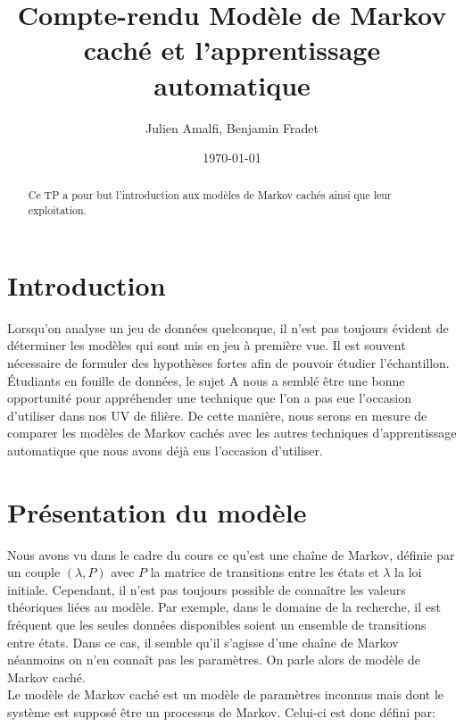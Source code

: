 \documentclass{article}
\title{Compte-rendu Modèle de Markov caché et l'apprentissage automatique}
\author{Julien Amalfi, Benjamin Fradet}
\date{\today}
\begin{document}
\maketitle
\thispagestyle{fancy}


\begin{abstract}
    Ce TP a pour but l'introduction aux modèles de Markov cachés ainsi que leur
    exploitation.
\end{abstract}


\begin{multicols}{2}

\section{Introduction}\label{sec:intro}

Lorsqu’on analyse un jeu de données quelconque, il n’est pas toujours évident de
déterminer les modèles qui sont mis en jeu à première vue. Il est souvent
nécessaire de formuler des hypothèses fortes afin de pouvoir étudier
l’échantillon. Étudiants en fouille de données, le sujet A nous a semblé être
une bonne opportunité pour appréhender une technique que l’on a pas eue
l’occasion d'utiliser dans nos UV de filière. De cette manière, nous serons en
mesure de comparer les modèles de Markov cachés avec les autres techniques
d'apprentissage automatique que nous avons déjà eus l'occasion d'utiliser.


\section{Présentation du modèle}\label{sec:model}

Nous avons vu dans le cadre du cours ce qu’est une chaîne de Markov, définie par
un couple $(\lambda, P)$ avec $P$ la matrice de transitions entre les états et
$\lambda$ la loi initiale. Cependant, il n’est pas toujours possible de connaître
les valeurs théoriques liées au modèle. Par exemple, dans le domaine de la
recherche, il est fréquent que les seules données disponibles soient un ensemble
de transitions entre états. Dans ce cas, il semble qu’il s’agisse d’une chaîne
de Markov néanmoins on n’en connaît pas les paramètres. On parle alors de modèle
de Markov caché. \\
Le modèle de Markov caché est un modèle de paramètres inconnus mais dont le
système est supposé être un processus de Markov. Celui-ci est donc défini par:


\end{multicols}
\end{document}

